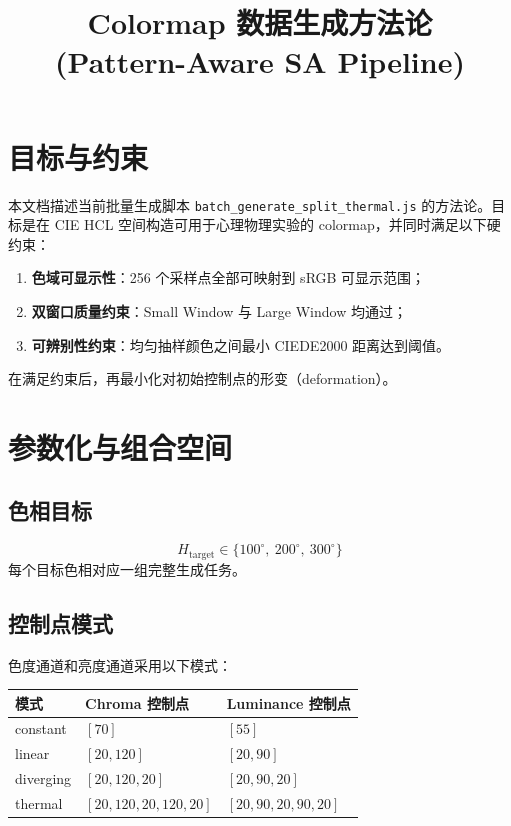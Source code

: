 \documentclass[UTF8,fontset=fandol]{ctexart}
\title{Colormap 数据生成方法论\\(Pattern-Aware SA Pipeline)}
\date{}
\begin{document}
\maketitle

\section{目标与约束}
本文档描述当前批量生成脚本 \texttt{batch\_generate\_split\_thermal.js} 的方法论。目标是在 CIE HCL 空间构造可用于心理物理实验的 colormap，并同时满足以下硬约束：
\begin{enumerate}
    \item \textbf{色域可显示性}：256 个采样点全部可映射到 sRGB 可显示范围；
    \item \textbf{双窗口质量约束}：Small Window 与 Large Window 均通过；
    \item \textbf{可辨别性约束}：均匀抽样颜色之间最小 CIEDE2000 距离达到阈值。
\end{enumerate}

在满足约束后，再最小化对初始控制点的形变（deformation）。

\section{参数化与组合空间}
\subsection{色相目标}
\begin{equation}
H_{\text{target}} \in \{100^\circ,\ 200^\circ,\ 300^\circ\}
\end{equation}
每个目标色相对应一组完整生成任务。

\subsection{控制点模式}
色度通道和亮度通道采用以下模式：
\begin{table}[h]
\centering
\begin{tabular}{lll}
\toprule
模式 & Chroma 控制点 & Luminance 控制点 \\
\midrule
constant & $[70]$ & $[55]$ \\
linear & $[20,120]$ & $[20,90]$ \\
diverging & $[20,120,20]$ & $[20,90,20]$ \\
thermal & $[20,120,20,120,20]$ & $[20,90,20,90,20]$ \\
\bottomrule
\end{tabular}
\end{table}
\end{document}
